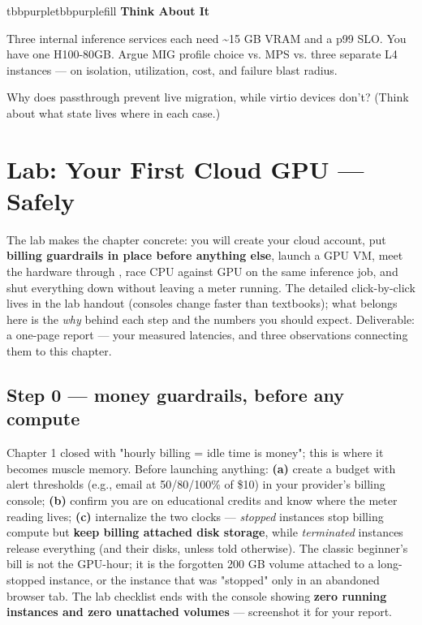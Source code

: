 \begin{calloutbox}{tbbpurple}{tbbpurplefill}
{\normalsize\bfseries\color{tbbpurple}Think About It}\par\vspace{3pt}
\begin{tbbitemize}
  \item Three internal inference services each need \textasciitilde{}15 GB VRAM and a p99 SLO. You have one H100-80GB. Argue MIG profile choice vs. MPS vs. three separate L4 instances — on isolation, utilization, cost, and failure blast radius.
  \item Why does passthrough prevent live migration, while virtio devices don't? (Think about what state lives where in each case.)
\end{tbbitemize}
\end{calloutbox}

\section{Lab: Your First Cloud GPU — Safely}

The lab makes the chapter concrete: you will create your cloud account, put \textbf{billing guardrails in place before anything else}, launch a GPU VM, meet the hardware through , race CPU against GPU on the same inference job, and shut everything down without leaving a meter running. The detailed click-by-click lives in the lab handout (consoles change faster than textbooks); what belongs here is the \textit{why} behind each step and the numbers you should expect. Deliverable: a one-page report — your measured latencies, and three observations connecting them to this chapter.

\subsection*{Step 0 — money guardrails, before any compute}

Chapter 1 closed with "hourly billing = idle time is money"; this is where it becomes muscle memory. Before launching anything: \textbf{(a)} create a budget with alert thresholds (e.g., email at 50/80/100\% of \$10) in your provider's billing console; \textbf{(b)} confirm you are on educational credits and know where the meter reading lives; \textbf{(c)} internalize the two clocks — \textit{stopped} instances stop billing compute but \textbf{keep billing attached disk storage}, while \textit{terminated} instances release everything (and their disks, unless told otherwise). The classic beginner's bill is not the GPU-hour; it is the forgotten 200 GB volume attached to a long-stopped instance, or the instance that was "stopped" only in an abandoned browser tab. The lab checklist ends with the console showing \textbf{zero running instances and zero unattached volumes} — screenshot it for your report.

